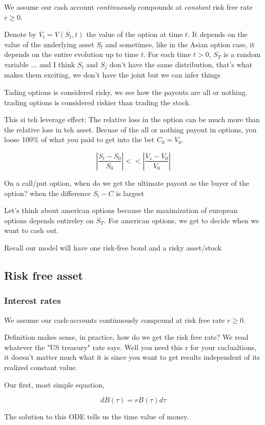 \documentclass{article}
\begin{document}
We assume our cash account \textit{continuously} compounds at \textit{constant} risk free rate $r \geq 0$. 


Denote by $V_t = V(S_t,t )$ the value of the option at time $t$. It depends on the value of the underlying asset $S_t$ and sometimes, like in the Asian option case, it depends on the entire evolution up to time $t$. For each time $t > 0$, $S_T$ is a random variable ... and I think $S_t$ and $S_j$ don't have the same distribution, that's what makes them exciting, we don't have the joint but we can infer things

Tading options is considered risky, we see how the payouts are all or nothing. trading options is considered  riskier than trading the stock. 

This si teh leverage effect: The relative loss in the option can be much more than the relative loss in teh asset. Becuae of the all or nothing payout in options, you loose 100\% of what you paid to get into the bet $C_0 = V_0$.

\[ |\frac{S_t - S_0}{S_0}| << |\frac{V_s-V_0}{V_0}|\]

On a call/put option, when do we get the ultimate payout as the buyer of the option? when the difference $S_t-C$ is largest 

Let's think about american options because the maximization of european options depends entireley on $S_T$. For american options, we get to decide when we want to cash out. 


Recall our model will have one risk-free bond and a risky asset/stock
\subsection{Risk free asset}
\subsubsection{Interest rates}
We assume our cash-accounts continuously compound at risk free rate $r \geq 0$.

Definition makes sense, in practice, how do we get the risk free rate? We read whatever the "US treasury" rate says. Well you need this r for your caclualtions, it doesn't matter much what it is since you want to get results independent of its realized constant value. 

Our first, most simple equation, 

\[ dB(\tau) = r  B(\tau) d\tau \]

The solution to this ODE tells us the time value of money. 
\end{document}
